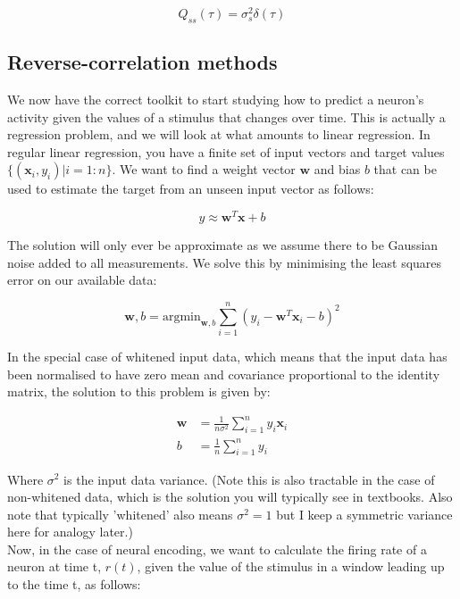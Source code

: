 \documentclass{article}
\begin{document}
\begin{equation*}
	Q_{ss}(\tau) = \sigma_s^2 \delta(\tau)
\end{equation*}

\subsection{Reverse-correlation methods}

We now have the correct toolkit to start studying how to predict a neuron's activity given the values of a stimulus that changes over time. This is actually a regression problem, and we will look at what amounts to linear regression. In regular linear regression, you have a finite set of input vectors and target values $\{(\bm{x}_i, y_i) | i=1:n\}$. We want to find a weight vector $\bm{w}$ and bias $b$ that can be used to estimate the target from an unseen input vector as follows:

\begin{equation*}
	y \approx \bm{w}^T\bm{x} + b
\end{equation*}

The solution will only ever be approximate as we assume there to be Gaussian noise added to all measurements. We solve this by minimising the least squares error on our available data:

\begin{equation*}
	\bm{w}, b = \text{argmin}_{\bm{w},b} \sum_{i=1}^n (y_i - \bm{w}^T\bm{x}_i - b)^2
\end{equation*}

In the special case of whitened input data, which means that the input data has been normalised to have zero mean and covariance proportional to the identity matrix, the solution to this problem is given by:

\begin{align*}
	\bm{w} & = \frac{1}{n\sigma^2} \sum_{i=1}^n y_i \bm{x}_i \\
	b      & = \frac{1}{n} \sum_{i=1}^n y_i
\end{align*}

Where $\sigma^2$ is the input data variance. (Note this is also tractable in the case of non-whitened data, which is the solution you will typically see in textbooks. Also note that typically 'whitened' also means $\sigma^2=1$ but I keep a symmetric variance here for analogy later.)\\

Now, in the case of neural encoding, we want to calculate the firing rate of a neuron at time t, $r(t)$, given the value of the stimulus in a window leading up to the time t, as follows:\\
\end{document}
